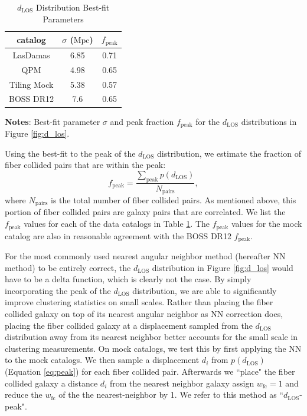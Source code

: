 \documentclass{emulateapj}
\begin{document}
 \begin{table} 
 \caption{$d_{\mathrm{LOS}}$ Distribution Best-fit Parameters} \label{tab:mpfit}
 \begin{spacing}{1.5}
 \begin{center}
 \leavevmode
 \begin{tabular}{ccc} \hline \hline
catalog &$\sigma$ ($\mathrm{Mpc}$) & $f_{\mathrm{peak}}$\\ \hline
LasDamas 	& 6.85	& 0.71 \\ 
QPM 		& 4.98	& 0.65 \\ 
Tiling Mock 	& 5.38	& 0.57 \\ 
BOSS DR12 	& 7.6		& 0.65 \\ \hline
\end{tabular} \par
\end{center}
\end{spacing}
{\bf Notes}: Best-fit parameter $\sigma$ and peak fraction $f_{\mathrm{peak}}$ for the $d_{\mathrm{LOS}}$ distributions in Figure \ref{fig:d_los}. 
\end{table}

Using the best-fit to the peak of the $d_{\mathrm{LOS}}$ distribution, we estimate the fraction of fiber collided pairs that are within the peak: 
\begin{equation}
f_{\mathrm{peak}} = \frac{\sum\limits_{\mathrm{peak}} p(d_{\mathrm{LOS}})}{N_{\mathrm{pairs}}}, 
\end{equation}
where $N_{\mathrm{pairs}}$ is the total number of fiber collided pairs. As mentioned above, this portion of fiber collided pairs are galaxy pairs that are correlated. We list the $f_{\mathrm{peak}}$ values for each of the data catalogs in Table \ref{tab:mpfit}. The $f_\mathrm{peak}$ values for the mock catalog are also in reasonable agreement with the BOSS DR12 $f_\mathrm{peak}$. 

For the most commonly used nearest angular neighbor method (hereafter NN method) to be entirely correct, the $d_{\mathrm{LOS}}$ distribution in Figure \ref{fig:d_los} would have to be a delta function, which is clearly not the case. By simply incorporating the peak of the $d_{\mathrm{LOS}}$ distribution, we are able to significantly improve clustering statistics on small scales. Rather than placing the fiber collided galaxy on top of its nearest angular neighbor as NN correction does, placing the fiber collided galaxy at a displacement sampled from the $d_{\mathrm{LOS}}$ distribution away from its nearest neighbor better accounts for the small scale in clustering measurements. On mock catalogs, we test this by first applying the NN to the mock catalogs. We then sample a displacement $d_i$ from $p(d_\mathrm{LOS})$ (Equation \ref{eq:peak}) for each fiber collided pair. Afterwards we ``place" the fiber collided galaxy a distance $d_i$ from the nearest neighbor galaxy assign $w_\mathrm{fc} = 1$ and reduce the $w_\mathrm{fc}$ of the the nearest-neighbor by 1. We refer to this method as ``$d_\mathrm{LOS}$-peak". 
\end{document}
